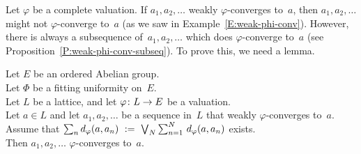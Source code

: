 \documentclass[main.tex]{subfiles}
\begin{document}
%
%
Let $\varphi$ be a complete valuation.
If $a_1,a_2,\dotsc$ weakly
$\varphi$-converges to~$a$,
then $a_1,a_2,\dotsc$ might not $\varphi$-converge to~$a$
(as we saw in Example~\ref{E:weak-phi-conv}).
However, 
there is always a subsequence of~$a_1,a_2,\dotsc$
which does $\varphi$-converge to~$a$
(see Proposition~\ref{P:weak-phi-conv-subseq}).
To prove this, we need a lemma.
\begin{lem}
\label{L:weak-phi-conv-sum}
Let $E$ be an ordered Abelian group.\\
Let $\Phi$ be a fitting uniformity on~$E$.\\
Let $L$ be a lattice, and let $\varphi\colon L \rightarrow E$ be a valuation.\\
Let $a \in L$ and let $a_1,a_2,\dotsc$ be a sequence in~$L$ 
that weakly $\varphi$-converges to~$a$.\\
Assume that 
$\textstyle{\sum_{n}} \,d_{\smash{\varphi}}(a,a_n) 
\ := \ \textstyle{\bigvee}_N  \sum_{n=1}^N  \,d_{\smash{\varphi}}(a,a_n)$ exists.\\
Then $a_1,a_2,\dotsc$ $\varphi$-converges to~$a$.
\end{lem}
\end{document}
